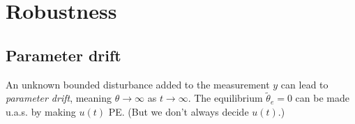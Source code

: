 \section{Robustness}

\subsection{Parameter drift}
An unknown bounded disturbance added to the measurement $y$ can lead to \emph{parameter drift}, meaning $\theta \to \infty$ as $t \to \infty$. The equilibrium $\tilde{\theta}_e = 0$ can be made u.a.s. by making $u(t)$ PE. (But we don't always decide $u(t)$.)

